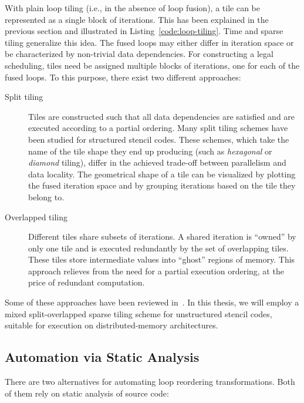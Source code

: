 With plain loop tiling (i.e., in the absence of loop fusion), a tile can be represented as a single block of iterations. This has been explained in the previous section and illustrated in Listing~\ref{code:loop-tiling}. Time and sparse tiling generalize this idea. The fused loops may either differ in iteration space or be characterized by non-trivial data dependencies. For constructing a legal scheduling, tiles need be assigned multiple blocks of iterations, one for each of the fused loops. To this purpose, there exist two different approaches:
\begin{description}
\item[Split tiling] Tiles are constructed such that all data dependencies are satisfied and are executed according to a partial ordering. Many split tiling schemes have been studied for structured stencil codes. These schemes, which take the name of the tile shape they end up producing (such as {\em hexagonal} or {\em diamond} tiling), differ in the achieved trade-off between parallelism and data locality. The geometrical shape of a tile can be visualized by plotting the fused iteration space and by grouping iterations based on the tile they belong to.
\item[Overlapped tiling] Different tiles share subsets of iterations. A shared iteration is ``owned'' by only one tile and is executed redundantly by the set of overlapping tiles. These tiles store intermediate values into ``ghost'' regions of memory. This approach relieves from the need for a partial execution ordering, at the price of redundant computation.
\end{description}
Some of these approaches have been reviewed in~\cite{survey-tile-shape}. In this thesis, we will employ a mixed split-overlapped sparse tiling scheme for unstructured stencil codes, suitable for execution on distributed-memory architectures.


\subsection{Automation via Static Analysis}
\label{sec:bkg:poly}
There are two alternatives for automating loop reordering transformations. Both of them rely on static analysis of source code:

